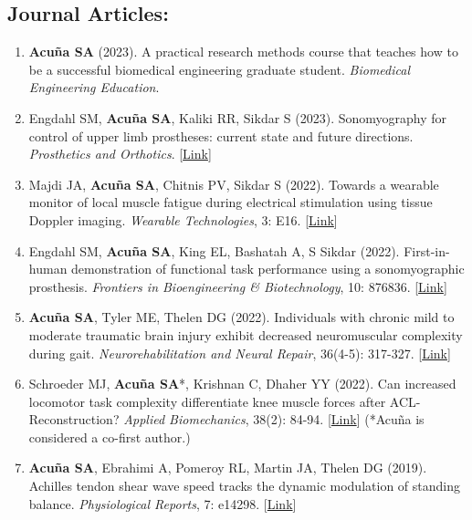 \documentclass[letterpaper, 10pt]{article}
\begin{document}
\subsection{Journal Articles:}
\begin{enumerate}
    \item \textbf{Acuña SA} (2023). A practical research methods course that teaches how to be a successful biomedical engineering graduate student. \textit{Biomedical Engineering Education}.
    \item Engdahl SM, \textbf{Acuña SA}, Kaliki RR, Sikdar S (2023). Sonomyography for control of upper limb prostheses: current state and future directions. \textit{Prosthetics and Orthotics}. [\href{https://journals.lww.com/jpojournal/fulltext/9900/sonomyography_for_control_of_upper_limb.44.aspx}{Link}]
    \item Majdi JA, \textbf{Acuña SA}, Chitnis PV, Sikdar S (2022). Towards a wearable monitor of local muscle fatigue during electrical stimulation using tissue Doppler imaging. \textit{Wearable Technologies}, 3: E16. [\href{https://www.cambridge.org/core/journals/wearable-technologies/article/toward-a-wearable-monitor-of-local-muscle-fatigue-during-electrical-muscle-stimulation-using-tissue-doppler-imaging/4ADA49B3A98D245E222D5CCFDE1F180D}{Link}]
    \item Engdahl SM, \textbf{Acuña SA}, King EL, Bashatah A, S Sikdar (2022). First-in-human demonstration of functional task performance using a sonomyographic prosthesis. \textit{Frontiers in Bioengineering \& Biotechnology}, 10: 876836. [\href{https://www.frontiersin.org/articles/10.3389/fbioe.2022.876836/full}{Link}]
    \item \textbf{Acuña SA}, Tyler ME, Thelen DG (2022). Individuals with chronic mild to moderate traumatic brain injury exhibit decreased neuromuscular complexity during gait. \textit{Neurorehabilitation and Neural Repair}, 36(4-5): 317-327. [\href{https://journals.sagepub.com/doi/full/10.1177/15459683221081064}{Link}]
    \item Schroeder MJ, \textbf{Acuña SA}*, Krishnan C, Dhaher YY (2022). Can increased locomotor task complexity differentiate knee muscle forces after ACL-Reconstruction? \textit{Applied Biomechanics}, 38(2): 84-94. [\href{https://journals.humankinetics.com/view/journals/jab/38/2/article-p84.xml}{Link}] (*Acuña is considered a co-ﬁrst author.)
    \item \textbf{Acuña SA}, Ebrahimi A, Pomeroy RL, Martin JA, Thelen DG (2019). Achilles tendon shear wave speed tracks the dynamic modulation of standing balance. \textit{Physiological Reports}, 7: e14298. [\href{https://physoc.onlinelibrary.wiley.com/doi/full/10.14814/phy2.14298}{Link}]

\end{enumerate}
\end{document}
